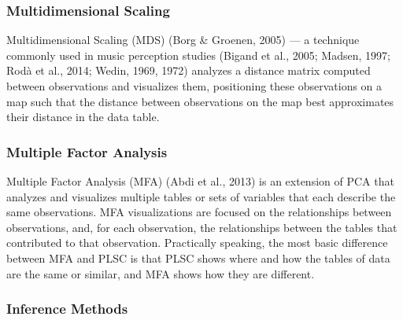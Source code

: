 \documentclass[
  english,
  man,floatsintext]{apa6}
\begin{document}
\hypertarget{multidimensional-scaling}{%
\subsubsection{Multidimensional Scaling}\label{multidimensional-scaling}}

Multidimensional Scaling (MDS) (Borg \& Groenen, 2005) --- a technique commonly used in music perception studies (Bigand et al., 2005; Madsen, 1997; Rodà et al., 2014; Wedin, 1969, 1972) analyzes a distance matrix computed between observations and visualizes them, positioning these observations on a map such that the distance between observations on the map best approximates their distance in the data table.

\hypertarget{multiple-factor-analysis}{%
\subsubsection{Multiple Factor Analysis}\label{multiple-factor-analysis}}

Multiple Factor Analysis (MFA) (Abdi et al., 2013) is an extension of PCA that analyzes and visualizes multiple tables or sets of variables that each describe the same observations. MFA visualizations are focused on the relationships between observations, and, for each observation, the relationships between the tables that contributed to that observation. Practically speaking, the most basic difference between MFA and PLSC is that PLSC shows where and how the tables of data are the same or similar, and MFA shows how they are different.

\hypertarget{inference-methods}{%
\subsubsection{Inference Methods}\label{inference-methods}}
\end{document}
